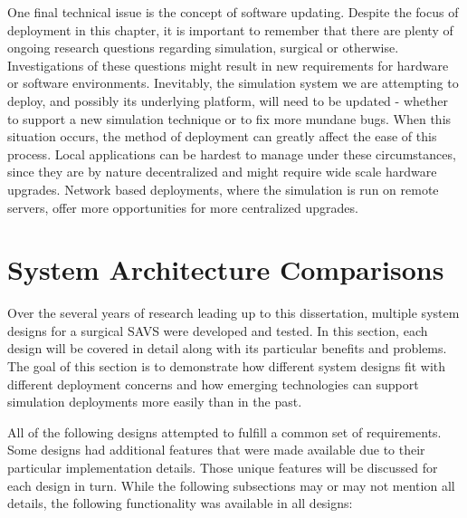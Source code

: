 One final technical issue is the concept of software updating. Despite
the focus of deployment in this chapter, it is important to remember
that there are plenty of ongoing research questions regarding
simulation, surgical or otherwise. Investigations of these questions
might result in new requirements for hardware or software
environments. Inevitably, the simulation system we are attempting to
deploy, and possibly its underlying platform, will need to be updated
- whether to support a new simulation technique or to fix more mundane
bugs. When this situation occurs, the method of deployment can greatly
affect the ease of this process. Local applications can be hardest to
manage under these circumstances, since they are by nature
decentralized and might require wide scale hardware upgrades. Network
based deployments, where the simulation is run on remote servers,
offer more opportunities for more centralized upgrades.

\section{System Architecture Comparisons}

Over the several years of research leading up to this dissertation,
multiple system designs for a surgical SAVS were developed and
tested. In this section, each design will be covered in detail along
with its particular benefits and problems. The goal of this section is
to demonstrate how different system designs fit with different
deployment concerns and how emerging technologies can support
simulation deployments more easily than in the past.

All of the following designs attempted to fulfill a common set of
requirements. Some designs had additional features that were made
available due to their particular implementation details. Those unique
features will be discussed for each design in turn. While the
following subsections may or may not mention all details, the following
functionality was available in all designs:

